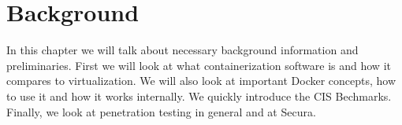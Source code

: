 \chapter{Background}

In this chapter we will talk about necessary background information and preliminaries. 
First we will look at what containerization software is and how it compares to virtualization. We will also look at important Docker concepts, how to use it and how it works internally. We quickly introduce the CIS Bechmarks. Finally, we look at penetration testing in general and at Secura.





